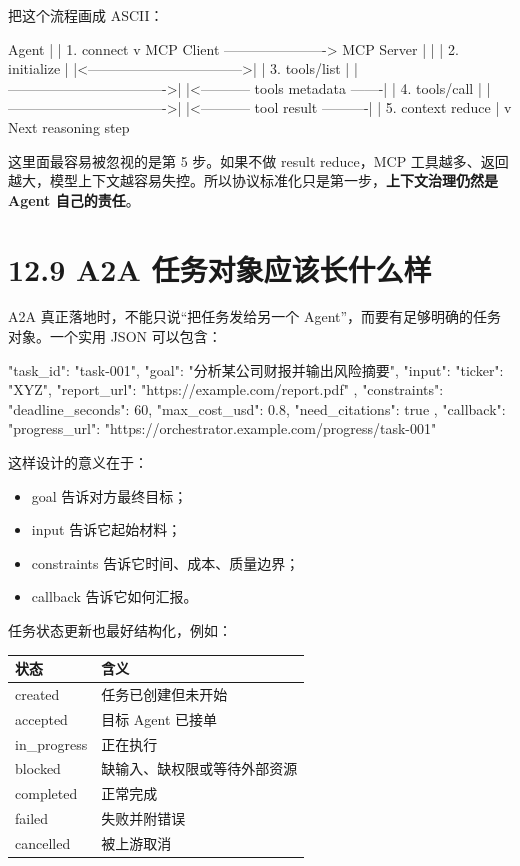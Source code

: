 把这个流程画成 ASCII：


\begin{codeblock}
Agent
  |
  | 1. connect
  v
MCP Client ----------------------> MCP Server
  |                                   |
  | 2. initialize                     |
  |<--------------------------------->|
  | 3. tools/list                     |
  |---------------------------------->|
  |<----------- tools metadata -------|
  | 4. tools/call                     |
  |---------------------------------->|
  |<----------- tool result ----------|
  | 5. context reduce                 |
  v
Next reasoning step
\end{codeblock}

这里面最容易被忽视的是第 5 步。如果不做 result reduce，MCP 工具越多、返回越大，模型上下文越容易失控。所以协议标准化只是第一步，\textbf{上下文治理仍然是 Agent 自己的责任}。


\section{12.9 A2A 任务对象应该长什么样}

A2A 真正落地时，不能只说``把任务发给另一个 Agent''，而要有足够明确的任务对象。一个实用 JSON 可以包含：


\begin{codeblock}
{
  "task_id": "task-001",
  "goal": "分析某公司财报并输出风险摘要",
  "input": {
    "ticker": "XYZ",
    "report_url": "https://example.com/report.pdf"
  },
  "constraints": {
    "deadline_seconds": 60,
    "max_cost_usd": 0.8,
    "need_citations": true
  },
  "callback": {
    "progress_url": "https://orchestrator.example.com/progress/task-001"
  }
}
\end{codeblock}

这样设计的意义在于：


\begin{itemize}[leftmargin=2em]
\item goal 告诉对方最终目标；
\item input 告诉它起始材料；
\item constraints 告诉它时间、成本、质量边界；
\item callback 告诉它如何汇报。
\end{itemize}

任务状态更新也最好结构化，例如：


\begingroup
\scriptsize
\setlength{\tabcolsep}{3pt}
\begin{longtable}{|p{}|p{}|}
\hline
状态 & 含义 \\ \hline
created & 任务已创建但未开始 \\ \hline
accepted & 目标 Agent 已接单 \\ \hline
in\_progress & 正在执行 \\ \hline
blocked & 缺输入、缺权限或等待外部资源 \\ \hline
completed & 正常完成 \\ \hline
failed & 失败并附错误 \\ \hline
cancelled & 被上游取消 \\ \hline
\end{longtable}
\endgroup

